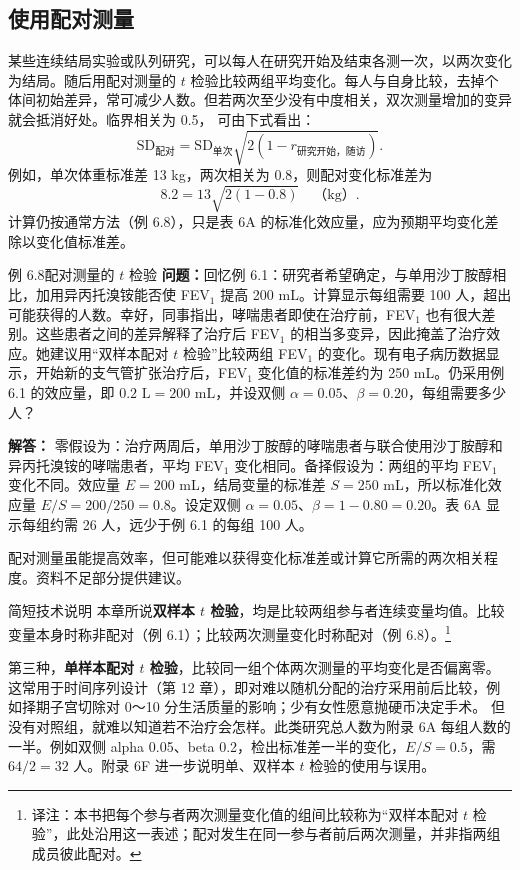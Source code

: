 \subsection{使用配对测量}
某些连续结局实验或队列研究，可以每人在研究开始及结束各测一次，以两次变化为结局。随后用配对测量的 $t$ 检验比较两组平均变化。每人与自身比较，去掉个体间初始差异，常可减少人数。但若两次至少没有中度相关，双次测量增加的变异就会抵消好处。临界相关为 0.5，
可由下式看出：
\[
\mathrm{SD}_{\text{配对}}=\mathrm{SD}_{\text{单次}}\sqrt{2(1-r_{\text{研究开始，随访}})}.
\]
例如，单次体重标准差 13 kg，两次相关为 0.8，则配对变化标准差为
\[
8.2=13\sqrt{2(1-0.8)}\quad\text{（kg）}.
\]
计算仍按通常方法（例 6.8），只是表 6A 的标准化效应量，应为预期平均变化差除以变化值标准差。
\begin{bookbox}{例 6.8\quad 配对测量的 $t$ 检验}
\textbf{问题：}回忆例 6.1：研究者希望确定，与单用沙丁胺醇相比，加用异丙托溴铵能否使 FEV$_1$ 提高 200 mL。计算显示每组需要 100 人，超出可能获得的人数。幸好，同事指出，哮喘患者即使在治疗前，FEV$_1$ 也有很大差别。这些患者之间的差异解释了治疗后 FEV$_1$ 的相当多变异，因此掩盖了治疗效应。她建议用“双样本配对 $t$ 检验”比较两组 FEV$_1$ 的变化。现有电子病历数据显示，开始新的支气管扩张治疗后，FEV$_1$ 变化值的标准差约为 250 mL。仍采用例 6.1 的效应量，即 $0.2\text{ L}=200\text{ mL}$，并设双侧 $\alpha=0.05$、$\beta=0.20$，每组需要多少人？

\textbf{解答：}
零假设为：治疗两周后，单用沙丁胺醇的哮喘患者与联合使用沙丁胺醇和异丙托溴铵的哮喘患者，平均 FEV$_1$ 变化相同。备择假设为：两组的平均 FEV$_1$ 变化不同。效应量 $E=200$ mL，结局变量的标准差 $S=250$ mL，所以标准化效应量 $E/S=200/250=0.8$。设定双侧 $\alpha=0.05$、$\beta=1-0.80=0.20$。表 6A 显示每组约需 26 人，远少于例 6.1 的每组 100 人。
\end{bookbox}
配对测量虽能提高效率，但可能难以获得变化标准差或计算它所需的两次相关程度。资料不足部分提供建议。
\begin{bookbox}{简短技术说明}
本章所说\textbf{双样本 $t$ 检验}，均是比较两组参与者连续变量均值。比较变量本身时称非配对（例 6.1）；比较两次测量变化时称配对（例 6.8）。\footnote{译注：本书把每个参与者两次测量变化值的组间比较称为“双样本配对 $t$ 检验”，此处沿用这一表述；配对发生在同一参与者前后两次测量，并非指两组成员彼此配对。}

第三种，\textbf{单样本配对 $t$ 检验}，比较同一组个体两次测量的平均变化是否偏离零。这常用于时间序列设计（第 12 章），即对难以随机分配的治疗采用前后比较，例如择期子宫切除对 0～10 分生活质量的影响；少有女性愿意抛硬币决定手术。
但没有对照组，就难以知道若不治疗会怎样。此类研究总人数为附录 6A 每组人数的一半。例如双侧 alpha 0.05、beta 0.2，检出标准差一半的变化，$E/S=0.5$，需 $64/2=32$ 人。附录 6F 进一步说明单、双样本 $t$ 检验的使用与误用。
\end{bookbox}

